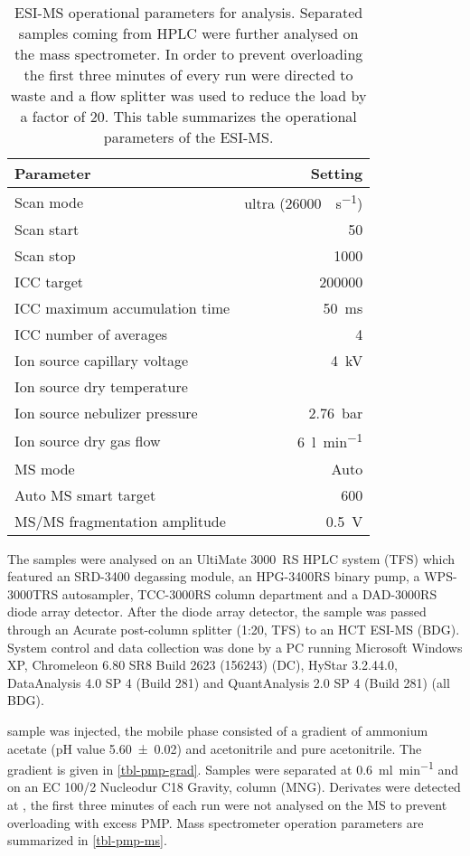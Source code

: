 \begin{table}
	\centering
	\caption[ESI-MS Operational Parameters for \AMC{} Analysis]{ESI-MS operational parameters for \amc{} analysis. Separated samples coming from HPLC were further analysed on the mass spectrometer. In order to prevent overloading the first three minutes of every run were directed to waste and a flow splitter was used to reduce the load by a factor of \num{20}. This table summarizes the operational parameters of the ESI-MS.\label{tbl-pmp-ms}}
	\begin{tabular}{lr}
		\toprule
		Parameter & {Setting} \\
		\hline
		Scan mode & {ultra (}\SI{26000}{\mz\per\s}{)} \\
		Scan start & \SI{50}{\mz} \\
		Scan stop & \SI{1000}{\mz} \\
		ICC target & 200000 \\
		ICC maximum accumulation time & \SI{50}{\milli\second} \\
		ICC number of averages & 4 \\
		Ion source capillary voltage & \SI{4}{\kilo\volt} \\
		Ion source dry temperature & \SIdC{325} \\
		Ion source nebulizer pressure & \SI{2.76}{\bar} \\
		Ion source dry gas flow & \SI{6}{\litre\per\minute} \\
		MS mode & {Auto} \\
		Auto MS smart target & \SI{600}{\mz} \\
		MS/MS fragmentation amplitude & \SI{0.5}{\volt} \\
		\bottomrule
	\end{tabular}
\end{table}
The samples were analysed on an UltiMate 3000~RS HPLC system (TFS) which featured an SRD-3400 degassing module, an HPG-3400RS binary pump, a WPS-3000TRS autosampler, TCC-3000RS column department and a DAD-3000RS diode array detector. After the diode array detector, the sample was passed through an Acurate post-column splitter (1:20, TFS) to an HCT ESI-MS (BDG). System control and data collection was done by a PC running Microsoft Windows XP, Chromeleon 6.80 SR8 Build 2623 (156243) (DC), HyStar 3.2.44.0, DataAnalysis 4.0 SP 4 (Build 281) and QuantAnalysis 2.0 SP 4 (Build 281) (all BDG).

 sample was injected, the mobile phase consisted of a gradient of   ammonium acetate (pH value \num{5.60(2)}) and  acetonitrile and pure acetonitrile. The gradient is given in \vref{tbl-pmp-grad}. Samples were separated at \SI{0.6}{\milli\litre\per\minute} and  on an EC 100/2 Nucleodur C18 Gravity,  column (MNG). Derivates were detected at , the first three minutes of each run were not analysed on the MS to prevent overloading with excess PMP. Mass spectrometer operation parameters are summarized in \vref{tbl-pmp-ms}.

